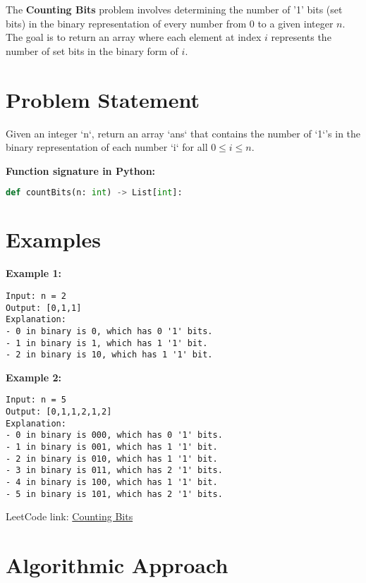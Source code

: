 
\label{problem:counting_bits}

The \textbf{Counting Bits} problem involves determining the number of '1' bits (set bits) in the binary representation of every number from \(0\) to a given integer \(n\). The goal is to return an array where each element at index \(i\) represents the number of set bits in the binary form of \(i\).

\section*{Problem Statement}

Given an integer `n`, return an array `ans` that contains the number of `1`'s in the binary representation of each number `i` for all \(0 \leq i \leq n\).

\textbf{Function signature in Python:}
\begin{lstlisting}[language=Python]
def countBits(n: int) -> List[int]:
\end{lstlisting}

\section*{Examples}

\textbf{Example 1:}

\begin{verbatim}
Input: n = 2
Output: [0,1,1]
Explanation:
- 0 in binary is 0, which has 0 '1' bits.
- 1 in binary is 1, which has 1 '1' bit.
- 2 in binary is 10, which has 1 '1' bit.
\end{verbatim}

\textbf{Example 2:}

\begin{verbatim}
Input: n = 5
Output: [0,1,1,2,1,2]
Explanation:
- 0 in binary is 000, which has 0 '1' bits.
- 1 in binary is 001, which has 1 '1' bit.
- 2 in binary is 010, which has 1 '1' bit.
- 3 in binary is 011, which has 2 '1' bits.
- 4 in binary is 100, which has 1 '1' bit.
- 5 in binary is 101, which has 2 '1' bits.
\end{verbatim}

LeetCode link: \href{https://leetcode.com/problems/counting-bits/}{Counting Bits}

\section*{Algorithmic Approach}

